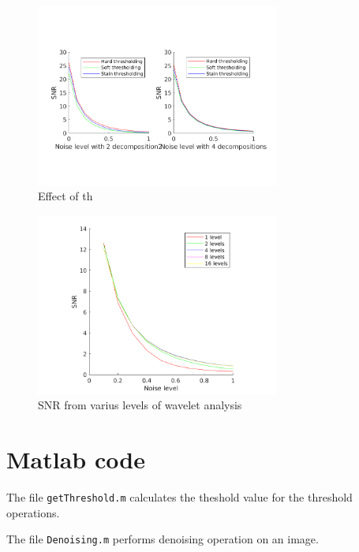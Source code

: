 \documentclass[a4paper,12pt]{article}
\begin{document}
\begin{figure}[t]
        \centering
        \includegraphics[width=8cm]{../Results/noise_levels.png}
        \caption{Effect of th}
		\label{fig:noiselevel}
\end{figure}


\begin{figure}[t]
        \centering
        \includegraphics[width=8cm]{../Results/noise_levels_vs_d.png}
        \caption{SNR from varius levels of wavelet analysis}
		\label{fig:delevel}
\end{figure}




\section{Matlab code}
The file \texttt{getThreshold.m} calculates the theshold value for the threshold operations.


\vspace{18}
\noindent The file \texttt{Denoising.m} performs denoising operation on an image.

\end{document}
